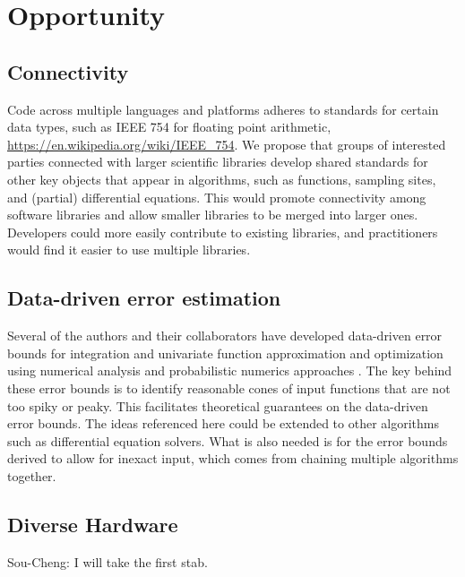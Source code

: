 \documentclass{amsart}
\newcommand{\SCTCNote}[1]{{\color{green}Sou-Cheng: #1}}
\begin{document}
   







\section{Opportunity} %
\subsection{Connectivity} 
Code across multiple languages and platforms adheres to standards for certain data types, such as IEEE 754 for floating point arithmetic, \url{https://en.wikipedia.org/wiki/IEEE_754}.  We propose that groups of interested parties connected with larger scientific libraries develop shared standards for other key objects that appear in algorithms, such as functions, sampling sites, and (partial) differential equations. This would promote connectivity among software libraries and allow smaller libraries to be merged into larger ones.  Developers could more easily contribute to existing libraries, and practitioners would find it easier to use multiple libraries.

\subsection{Data-driven error estimation} 
Several of the authors and their collaborators have developed data-driven error bounds for integration and univariate function approximation and optimization using numerical analysis and probabilistic numerics approaches \cite{ChoEtal17a, HicEtal14b, HicEtal14a, HicJim16a, RatHic19a,JimHic16a}.  The key behind these error bounds is to identify reasonable cones of input functions that are not too spiky or peaky.  This facilitates theoretical guarantees on the data-driven error bounds.  The ideas referenced here could be extended to other algorithms such as differential equation solvers.  What is also needed is for the error bounds derived to allow for inexact input, which comes from chaining multiple algorithms together.

\subsection{Diverse Hardware} \SCTCNote{I will take the first stab.}
\end{document}

